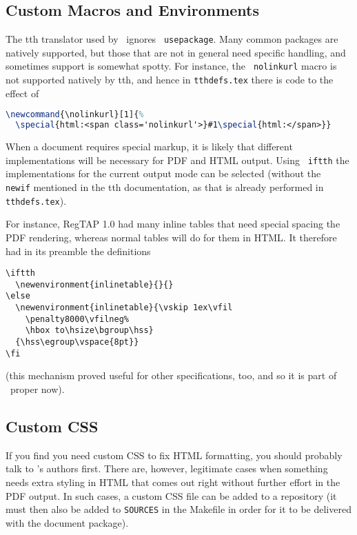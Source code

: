 \documentclass[11pt,a4paper]{ivoa}
\newcommand{\texword}[1]{\texttt{\color{texcolor} #1}}
\begin{document}
\subsection{Custom Macros and Environments}

The tth translator used by \ivoatex\ ignores \texword{usepackage}.  Many
common packages are natively supported, but those that are not in
general need specific handling, and sometimes support is somewhat spotty.  
For instance, the \texword{nolinkurl}
macro is not supported natively by tth, and hence in
\texttt{tthdefs.tex} there is code to the effect of
\begin{lstlisting}[language=TeX,basicstyle=\footnotesize]
\newcommand{\nolinkurl}[1]{%
  \special{html:<span class='nolinkurl'>}#1\special{html:</span>}}
\end{lstlisting}

When a document requires special markup, it is likely that 
different implementations will be necessary for PDF and HTML output.
Using \texword{iftth} the implementations for the current output mode
can be selected (without the \texword{newif} mentioned in the tth
documentation, as that is already performed in \texttt{tthdefs.tex}).

For instance, RegTAP 1.0 had many inline tables that need special spacing
the PDF rendering, whereas normal tables will do for them
in HTML.  It therefore
had in its preamble the definitions
\begin{lstlisting}
\iftth
  \newenvironment{inlinetable}{}{}
\else
  \newenvironment{inlinetable}{\vskip 1ex\vfil
    \penalty8000\vfilneg%
    \hbox to\hsize\bgroup\hss}
  {\hss\egroup\vspace{8pt}}
\fi
\end{lstlisting}

(this mechanism proved useful for other specifications, too, and so
it is part of \ivoatex~proper now).

\subsection{Custom CSS}
\label{sect:customcss}

If you find you need custom CSS to fix HTML formatting, you should
probably talk to \ivoatex's authors first.  There are, however, 
legitimate cases when something needs extra styling in HTML that 
comes out right without further effort
in the PDF output.  In such cases, a custom CSS file can
be added to a repository (it must then also be added to \texttt{SOURCES}
in the Makefile in order for it to be delivered with the document
package).
\end{document}
